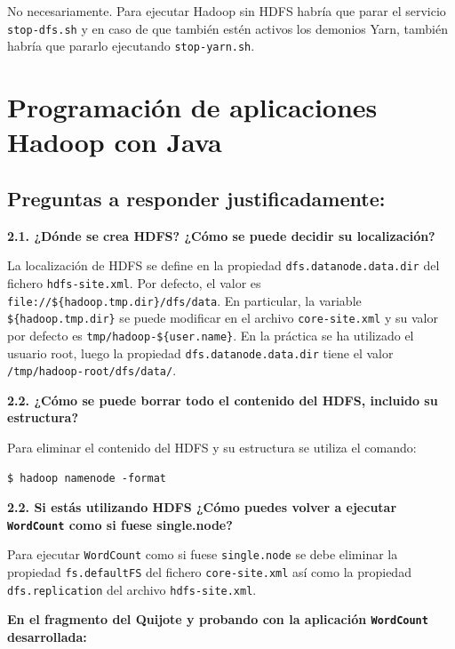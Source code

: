 \documentclass[10pt,swedish, openany]{book}
\begin{document}
No necesariamente. Para ejecutar Hadoop sin HDFS habría que parar el servicio \texttt{stop-dfs.sh} y en caso de que también estén activos los demonios Yarn, también habría que  pararlo ejecutando \texttt{stop-yarn.sh}.


\section{Programación de aplicaciones Hadoop con Java}
\subsection*{Preguntas a responder justificadamente:}

\textbf{2.1. ¿Dónde se crea HDFS? ¿Cómo se puede decidir su localización?}

La localización de HDFS se define en la propiedad \texttt{dfs.datanode.data.dir} del fichero \texttt{hdfs-site.xml}. Por defecto, el valor es \texttt{file://\$\{hadoop.tmp.dir\}/dfs/data}. En particular, la variable \texttt{\$\{hadoop.tmp.dir\}} se puede modificar en el archivo \texttt{core-site.xml} y su valor por defecto es \texttt{tmp/hadoop-\$\{user.name\}}. En la práctica se ha utilizado el usuario root, luego la propiedad \texttt{dfs.datanode.data.dir} tiene el valor \texttt{/tmp/hadoop-root/dfs/data/}.
\vspace{0.8em}

\textbf{2.2. ¿Cómo se puede borrar todo el contenido del HDFS, incluido su estructura?}

Para eliminar el contenido del HDFS y su estructura se utiliza el comando:

\begin{lstlisting}
$ hadoop namenode -format
\end{lstlisting}

\vspace{0.8em}

\textbf{2.2. Si estás utilizando HDFS ¿Cómo puedes volver a ejecutar \texttt{WordCount} como si fuese single.node?}
 
Para ejecutar \texttt{WordCount} como si fuese \texttt{single.node} se debe eliminar la propiedad \texttt{fs.defaultFS} del fichero \texttt{core-site.xml} así como la propiedad \texttt{dfs.replication} del archivo \texttt{hdfs-site.xml}.


\textbf{En el fragmento del Quijote y probando con la aplicación \texttt{WordCount} desarrollada:}
\end{document}
